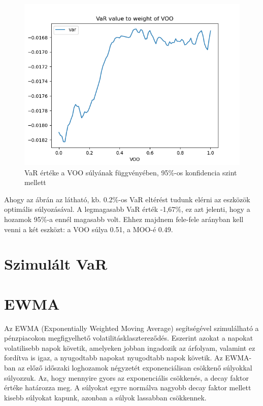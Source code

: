 \documentclass[12pt]{article}
\begin{document}
\begin{figure}[H]
	\centering
	\includegraphics[scale=0.9]{var}
	\caption{VaR értéke a VOO súlyának függvényében, 95\%-os konfidencia szint mellett}
\end{figure}

Ahogy az ábrán az látható, kb. 0.2\%-os VaR eltérést tudunk elérni az eszközök optimális súlyozásával. A legmagasabb VaR érték -1,67\%, ez azt jelenti, hogy a hozamok 95\%-a ennél magasabb volt. Ehhez majdnem fele-fele arányban kell venni a két eszközt: a VOO súlya 0.51, a MOO-é 0.49.



\section{Szimulált VaR}



\section{EWMA}

Az EWMA (Exponentially Weighted Moving Average) segítségével szimulálható a pénzpiacokon megfigyelhető volatilitásklasztereződés. Eszerint azokat a napokat volatilisebb napok követik, amelyeken jobban ingadozik az árfolyam, valamint ez fordítva is igaz, a nyugodtabb napokat nyugodtabb napok követik. Az EWMA-ban az előző időszaki loghozamok négyzetét exponenciálisan csökkenő súlyokkal súlyozzuk. Az, hogy mennyire gyors az exponenciális csökkenés, a decay faktor értéke határozza meg. A súlyokat egyre normálva nagyobb decay faktor mellett kisebb súlyokat kapunk, azonban a súlyok lassabban csökkennek.
\end{document}
